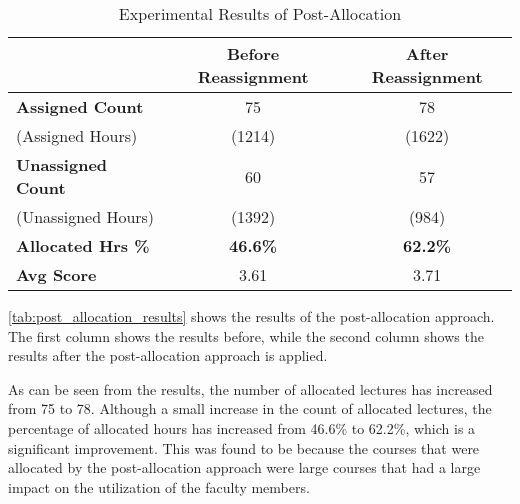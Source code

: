 \begin{table}[H]
  \centering
  \begin{tabular}{|l|c|c|}
    \hline
    \textbf{}                 & \textbf{Before Reassignment} & \textbf{After Reassignment} \\ \hline
    \textbf{Assigned Count}   & 75                           & 78                          \\
    (Assigned Hours)          & (1214)                       & (1622)                      \\
    \textbf{Unassigned Count} & 60                           & 57                          \\
    (Unassigned Hours)        & (1392)                       & (984)                       \\
    \textbf{Allocated Hrs \%} & \textbf{46.6\%}              & \textbf{62.2\%}             \\
    \textbf{Avg Score}        & 3.61                         & 3.71                        \\
    \hline
  \end{tabular}
  \caption{Experimental Results of Post-Allocation}
  \label{tab:post_allocation_results}
\end{table}

\autoref{tab:post_allocation_results} shows the results of the post-allocation approach. The first column shows the results before, while the second column shows the results after the post-allocation approach is applied.

As can be seen from the results, the number of allocated lectures has increased from 75 to 78. Although a small increase in the count of allocated lectures, the percentage of allocated hours has increased from 46.6\% to 62.2\%, which is a significant improvement. This was found to be because the courses that were allocated by the post-allocation approach were large courses that had a large impact on the utilization of the faculty members.

